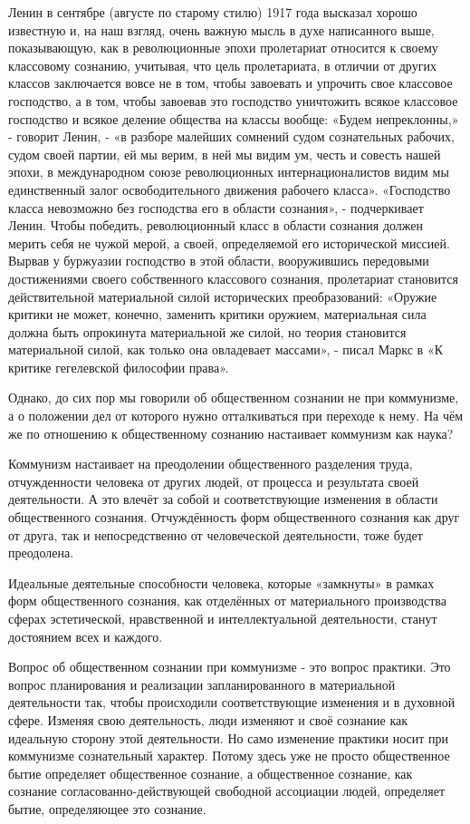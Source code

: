 \documentclass[../main]{subfiles}
\begin{document}
Ленин в сентябре (августе по старому стилю) 1917 года высказал хорошо известную и, на наш взгляд, очень важную мысль в духе написанного выше, показывающую, как в революционные эпохи пролетариат относится к своему классовому сознанию, учитывая, что цель пролетариата, в отличии от других классов заключается вовсе не в том, чтобы завоевать и упрочить свое классовое господство, а в том, чтобы завоевав это господство уничтожить всякое классовое господство и всякое деление общества на классы вообще: «Будем непреклонны,» - говорит Ленин, - «в разборе малейших сомнений судом сознательных рабочих, судом своей партии, ей мы верим, в ней мы видим ум, честь и совесть нашей эпохи, в международном союзе революционных интернационалистов видим мы единственный залог освободительного движения рабочего класса». «Господство класса невозможно без господства его в области сознания», - подчеркивает Ленин. Чтобы победить, революционный класс в области сознания должен мерить себя не чужой мерой, а своей, определяемой его исторической миссией. Вырвав у буржуазии господство в этой области, вооружившись передовыми достижениями своего собственного классового сознания, пролетариат становится действительной материальной силой исторических преобразований: «Оружие критики не может, конечно, заменить критики оружием, материальная сила должна быть опрокинута материальной же силой, но теория становится материальной силой, как только она овладевает массами», - писал Маркс в «К критике гегелевской философии права».

Однако, до сих пор мы говорили об общественном сознании не при коммунизме, а о положении дел от которого нужно отталкиваться при переходе к нему. На чём же по отношению к общественному сознанию настаивает коммунизм как наука?

Коммунизм настаивает на преодолении общественного разделения труда, отчужденности человека от других людей, от процесса и результата своей деятельности. А это влечёт за собой и соответствующие изменения в области общественного сознания. Отчуждённость форм общественного сознания как друг от друга, так и непосредственно от человеческой деятельности, тоже будет преодолена.

Идеальные деятельные способности человека, которые «замкнуты» в рамках форм общественного сознания, как отделённых от материального производства сферах эстетической, нравственной и интеллектуальной деятельности, станут достоянием всех и каждого.

Вопрос об общественном сознании при коммунизме - это вопрос практики. Это вопрос планирования и реализации запланированного в материальной деятельности так, чтобы происходили соответствующие изменения и в духовной сфере. Изменяя свою деятельность, люди изменяют и своё сознание как идеальную сторону этой деятельности. Но само изменение практики носит при коммунизме сознательный характер. Потому здесь уже не просто общественное бытие определяет общественное сознание, а общественное сознание, как сознание согласованно-действующей свободной ассоциации людей, определяет бытие, определяющее это сознание.
\end{document}
